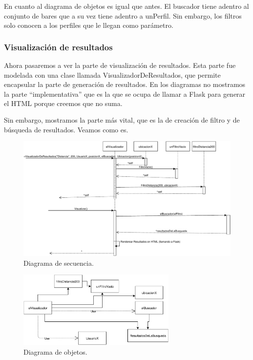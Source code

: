 En cuanto al diagrama de objetos es igual que antes. El buscador tiene adentro al conjunto de bares que a su vez tiene adentro a unPerfil. Sin embargo, los filtros solo conocen a los perfiles que le llegan como parámetro.

\subsubsection{Visualización de resultados}

Ahora pasaremos a ver la parte de visualización de resultados. Esta parte fue modelada con una clase llamada VisualizadorDeResultados, que permite encapsular la parte de generación de resultados. En los diagramas no mostramos la parte ``implementativa'' que es la que se ocupa de llamar a Flask para generar el HTML porque creemos que no suma.

Sin embargo, mostramos la parte más vital, que es la de creación de filtro y de búsqueda de resultados. Veamos como es.

\begin{figure}[H]
  \centering
  \includegraphics[width=\textwidth]{diagramas/secuencia_4.pdf}
  \caption{\normalfont Diagrama de secuencia.}
\end{figure}

\begin{figure}[H]
  \centering
  \includegraphics[width=0.7\textwidth]{diagramas/objetos_4.pdf}
  \caption{\normalfont Diagrama de objetos.}
\end{figure}

